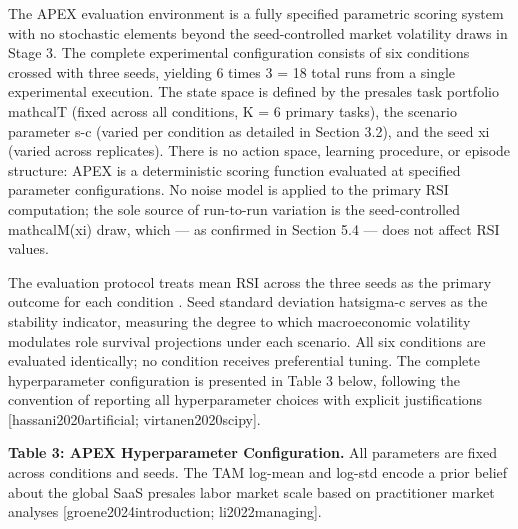 \documentclass[10pt, conference]{IEEEtran}
\begin{document}
\label{sec:evaluation_environment_and_experimental_}

The APEX evaluation environment is a fully specified parametric scoring system with no stochastic elements beyond the seed-controlled market volatility draws in Stage 3. The complete experimental configuration consists of six conditions crossed with three seeds, yielding 6 times 3 = 18 total runs from a single experimental execution. The state space is defined by the presales task portfolio mathcalT (fixed across all conditions, K = 6 primary tasks), the scenario parameter s-c (varied per condition as detailed in Section 3.2), and the seed xi (varied across replicates). There is no action space, learning procedure, or episode structure: APEX is a deterministic scoring function evaluated at specified parameter configurations. No noise model is applied to the primary RSI computation; the sole source of run-to-run variation is the seed-controlled mathcalM(xi) draw, which --- as confirmed in Section 5.4 --- does not affect RSI values.

The evaluation protocol treats mean RSI across the three seeds as the primary outcome for each condition \cite{wiser2021expert}. Seed standard deviation hatsigma-c serves as the stability indicator, measuring the degree to which macroeconomic volatility modulates role survival projections under each scenario. All six conditions are evaluated identically; no condition receives preferential tuning. The complete hyperparameter configuration is presented in Table 3 below, following the convention of reporting all hyperparameter choices with explicit justifications [hassani2020artificial; virtanen2020scipy].

\textbf{Table 3: APEX Hyperparameter Configuration.} All parameters are fixed across conditions and seeds. The TAM log-mean and log-std encode a prior belief about the global SaaS presales labor market scale based on practitioner market analyses [groene2024introduction; li2022managing].
\end{document}
